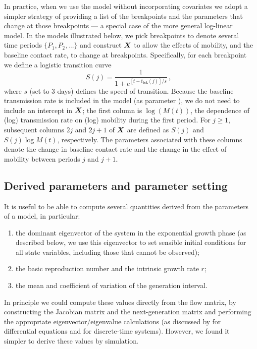 \documentclass[12pt]{article}\usepackage[]{graphicx}\usepackage[]{color}
\begin{document}
In practice, when we use the model without incorporating covariates we adopt a simpler strategy of providing a list of the breakpoints and the parameters that change at those breakpoints --- a special case of the more general log-linear model. In the models illustrated below, we pick breakpoints to denote several time periods $\{P_1, P_2, \ldots\}$ and construct $\boldsymbol{X}$ to allow the effects of mobility, and the baseline contact rate, to change at breakpoints.
Specifically, for each breakpoint we define a logistic transition curve 
\begin{equation}
S(j) = \frac{1}{1+e^{[t-t_\textrm{brk}(j)]/s}} \,,
\end{equation}
where $s$ (set to 3 days) defines the speed of transition. Because the baseline transmission rate is included in the model (as parameter ), we do not need to include an intercept in $\boldsymbol{X}$; the first column is $\log(M(t))$, the dependence of (log) transmission rate on (log) mobility during the first period. For $j \ge 1$, subsequent columns $2j$ and $2j+1$ of $\boldsymbol{X}$ are defined as $S(j)$ and $S(j) \log M(t)$, respectively. The parameters associated with these columns denote the change in baseline contact rate and the change in the effect of mobility between periods $j$ and $j+1$.
  
\subsection*{Derived parameters and parameter setting}

It is useful to be able to compute several quantities derived from the parameters of a model, in particular:
\begin{enumerate}
\item the dominant eigenvector of the system in the exponential growth phase
  (as described below, we use this eigenvector to set sensible initial conditions for all state variables, including those that cannot be observed);
\item the basic reproduction number \Rzero and the intrinsic growth rate $r$;
\item the mean and coefficient of variation of the generation interval. 
\end{enumerate}
In principle we could compute these values directly from the flow matrix, by constructing the Jacobian matrix and the next-generation matrix and performing the appropriate eigenvector/eigenvalue calculations (as discussed by \cite{VandWatm02} for differential equations and \cite{Casw00} for discrete-time systems). However, we found it simpler to derive these values by simulation.
\end{document}
